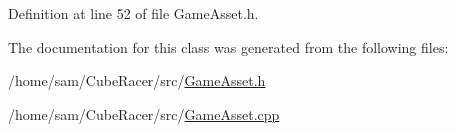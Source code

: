 Definition at line 52 of file Game\-Asset.\-h.



The documentation for this class was generated from the following files\-:\begin{DoxyCompactItemize}
\item 
/home/sam/\-Cube\-Racer/src/\hyperlink{GameAsset_8h}{Game\-Asset.\-h}\item 
/home/sam/\-Cube\-Racer/src/\hyperlink{GameAsset_8cpp}{Game\-Asset.\-cpp}\end{DoxyCompactItemize}
